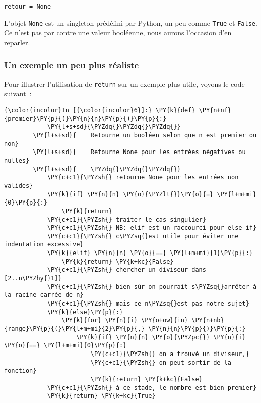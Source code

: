     \begin{Verbatim}[commandchars=\\\{\},frame=single,framerule=0.3mm,rulecolor=\color{cellframecolor}]
retour = None
\end{Verbatim}

    L'objet \texttt{None} est un singleton prédéfini par Python, un peu
comme \texttt{True} et \texttt{False}. Ce n'est pas par contre une
valeur booléenne, nous aurons l'occasion d'en reparler.

    \hypertarget{un-exemple-un-peu-plus-ruxe9aliste}{%
\subsubsection{Un exemple un peu plus
réaliste}\label{un-exemple-un-peu-plus-ruxe9aliste}}

    Pour illustrer l'utilisation de \texttt{return} sur un exemple plus
utile, voyons le code suivant~:

    \begin{Verbatim}[commandchars=\\\{\},frame=single,framerule=0.3mm,rulecolor=\color{cellframecolor}]
{\color{incolor}In [{\color{incolor}6}]:} \PY{k}{def} \PY{n+nf}{premier}\PY{p}{(}\PY{n}{n}\PY{p}{)}\PY{p}{:}
            \PY{l+s+sd}{\PYZdq{}\PYZdq{}\PYZdq{}}
        \PY{l+s+sd}{    Retourne un booléen selon que n est premier ou non}
        \PY{l+s+sd}{    Retourne None pour les entrées négatives ou nulles}
        \PY{l+s+sd}{    \PYZdq{}\PYZdq{}\PYZdq{}}
            \PY{c+c1}{\PYZsh{} retourne None pour les entrées non valides}
            \PY{k}{if} \PY{n}{n} \PY{o}{\PYZlt{}}\PY{o}{=} \PY{l+m+mi}{0}\PY{p}{:}
                \PY{k}{return}
            \PY{c+c1}{\PYZsh{} traiter le cas singulier}
            \PY{c+c1}{\PYZsh{} NB: elif est un raccourci pour else if}
            \PY{c+c1}{\PYZsh{} c\PYZsq{}est utile pour éviter une indentation excessive}
            \PY{k}{elif} \PY{n}{n} \PY{o}{==} \PY{l+m+mi}{1}\PY{p}{:}
                \PY{k}{return} \PY{k+kc}{False}
            \PY{c+c1}{\PYZsh{} chercher un diviseur dans [2..n\PYZhy{}1]}
            \PY{c+c1}{\PYZsh{} bien sûr on pourrait s\PYZsq{}arrêter à la racine carrée de n}
            \PY{c+c1}{\PYZsh{} mais ce n\PYZsq{}est pas notre sujet}
            \PY{k}{else}\PY{p}{:}
                \PY{k}{for} \PY{n}{i} \PY{o+ow}{in} \PY{n+nb}{range}\PY{p}{(}\PY{l+m+mi}{2}\PY{p}{,} \PY{n}{n}\PY{p}{)}\PY{p}{:}
                    \PY{k}{if} \PY{n}{n} \PY{o}{\PYZpc{}} \PY{n}{i} \PY{o}{==} \PY{l+m+mi}{0}\PY{p}{:}
                        \PY{c+c1}{\PYZsh{} on a trouvé un diviseur,}
                        \PY{c+c1}{\PYZsh{} on peut sortir de la fonction}
                        \PY{k}{return} \PY{k+kc}{False}
            \PY{c+c1}{\PYZsh{} à ce stade, le nombre est bien premier}
            \PY{k}{return} \PY{k+kc}{True}
\end{Verbatim}


